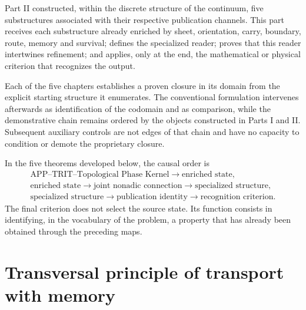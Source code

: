 
\ifdefined\HMTSucesoraStructureTrace
\fi

Part II constructed, within the discrete structure of the continuum, five
substructures associated with their respective publication channels. This part receives
each substructure already
enriched by sheet, orientation, carry, boundary, route, memory and
survival; defines the specialized reader; proves that this reader
intertwines refinement; and applies, only at the end, the mathematical or
physical criterion that recognizes the output.

Each of the five chapters establishes a proven closure in its
domain from the explicit starting structure it enumerates. The
conventional formulation intervenes afterwards as identification of the
codomain and as comparison, while the demonstrative chain remains
ordered by the objects constructed in Parts I and II. Subsequent auxiliary
controls are not edges of that chain and have no capacity
to condition or demote the proprietary closure.

In the five theorems developed below, the causal order is
\begin{equation}\label{eq:realizaciones-orden-causal}
 \begin{gathered}
 \text{APP--TRIT--Topological Phase Kernel}
 \longrightarrow \text{enriched state},\\
 \text{enriched state}
 \longrightarrow \text{joint nonadic connection}
 \longrightarrow \text{specialized structure},\\
 \text{specialized structure}
 \longrightarrow \text{publication identity}
 \longrightarrow \text{recognition criterion}.
 \end{gathered}
\end{equation}
The final criterion does not select the source state. Its function consists in
identifying, in the vocabulary of the problem, a property that has already been
obtained through the preceding maps.

\section*{Transversal principle of transport with memory}

